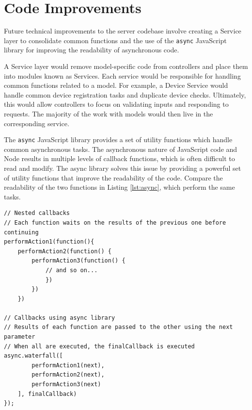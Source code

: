 \section{Code Improvements}

Future technical improvements to the server codebase involve creating a Service layer to consolidate common functions and the use of the \texttt{async} JavaScript library for improving the readability of asynchronous code. 

A Service layer would remove model-specific code from controllers and place them into modules known as Services. Each service would be responsible for handling common functions related to a model. For example, a Device Service would handle common device registration tasks and duplicate device checks. Ultimately, this would allow controllers to focus on validating inputs and responding to requests. The majority of the work with models would then live in the corresponding service.

The \texttt{async} JavaScript library provides a set of utility functions which handle common asynchronous tasks. The asynchronous nature of JavaScript code and Node results in multiple levels of callback functions, which is often difficult to read and modify. The async library solves this issue by providing a powerful set of utility functions that improve the readability of the code. Compare the readability of the two functions in Listing \ref{lst:async}, which perform the same tasks. 

\medskip
\begin{lstlisting}[caption={[Typical Nested Code vs \texttt{async} library]Comparison between normal callback code and \texttt{async} code}, label={lst:async}]
// Nested callbacks
// Each function waits on the results of the previous one before continuing
performAction1(function(){
	performAction2(function() {
		performAction3(function() {
			// and so on...
			})
		})
	})

// Callbacks using async library
// Results of each function are passed to the other using the next parameter
// When all are executed, the finalCallback is executed
async.waterfall([
		performAction1(next), 
		performAction2(next),
		performAction3(next)
	], finalCallback)
});
\end{lstlisting}









